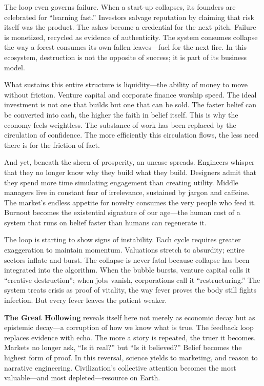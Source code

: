 \documentclass[11pt,twoside]{book}
\begin{document}
The loop even governs failure.  When a start-up collapses, its founders are celebrated for “learning fast.”  Investors salvage reputation by claiming that risk itself was the product.  The ashes become a credential for the next pitch.  Failure is monetized, recycled as evidence of authenticity.  The system consumes collapse the way a forest consumes its own fallen leaves—fuel for the next fire.  In this ecosystem, destruction is not the opposite of success; it is part of its business model.

What sustains this entire structure is liquidity—the ability of money to move without friction.  Venture capital and corporate finance worship speed.  The ideal investment is not one that builds but one that can be sold.  The faster belief can be converted into cash, the higher the faith in belief itself.  This is why the economy feels weightless.  The substance of work has been replaced by the circulation of confidence.  The more efficiently this circulation flows, the less need there is for the friction of fact.

And yet, beneath the sheen of prosperity, an unease spreads.  Engineers whisper that they no longer know why they build what they build.  Designers admit that they spend more time simulating engagement than creating utility.  Middle managers live in constant fear of irrelevance, sustained by jargon and caffeine.  The market’s endless appetite for novelty consumes the very people who feed it.  Burnout becomes the existential signature of our age—the human cost of a system that runs on belief faster than humans can regenerate it.

The loop is starting to show signs of instability.  Each cycle requires greater exaggeration to maintain momentum.  Valuations stretch to absurdity; entire sectors inflate and burst.  The collapse is never fatal because collapse has been integrated into the algorithm.  When the bubble bursts, venture capital calls it “creative destruction”; when jobs vanish, corporations call it “restructuring.”  The system treats crisis as proof of vitality, the way fever proves the body still fights infection.  But every fever leaves the patient weaker.

\textbf{The Great Hollowing} reveals itself here not merely as economic decay but as epistemic decay—a corruption of how we know what is true.  The feedback loop replaces evidence with echo.  The more a story is repeated, the truer it becomes.  Markets no longer ask, “Is it real?” but “Is it believed?”  Belief becomes the highest form of proof.  In this reversal, science yields to marketing, and reason to narrative engineering.  Civilization’s collective attention becomes the most valuable—and most depleted—resource on Earth.
\end{document}
